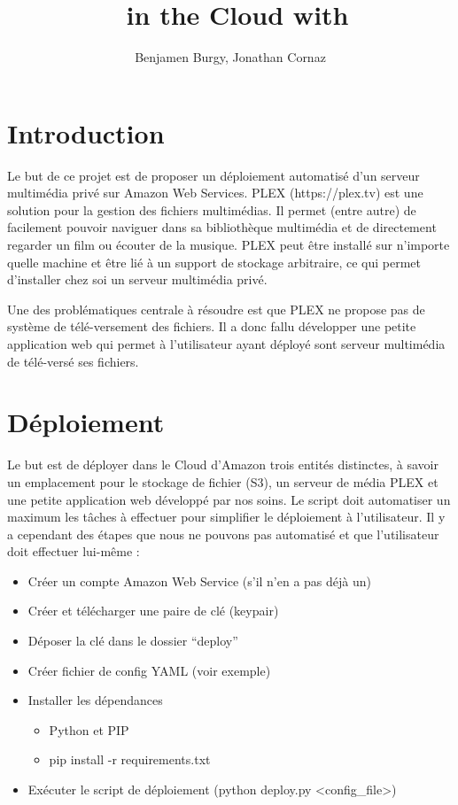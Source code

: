 \documentclass[french]{msereport}
\title{\plex\ in the Cloud with \aws}
\author{Benjamen Burgy, Jonathan Cornaz}
\begin{document}
	
	\section{Introduction}
		Le but de ce projet est de proposer un déploiement automatisé d’un serveur multimédia privé sur Amazon Web Services.
		PLEX (https://plex.tv) est une solution pour la gestion des fichiers multimédias. Il permet (entre autre) de facilement pouvoir naviguer dans sa bibliothèque multimédia et de directement regarder un film ou écouter de la musique. PLEX peut être installé sur n’importe quelle machine et être lié à un support de stockage arbitraire, ce qui permet d’installer chez soi un serveur multimédia privé.
		
		Une des problématiques centrale à résoudre est que PLEX ne propose pas de système de télé-versement des fichiers. Il a donc fallu développer une petite application web qui permet à l’utilisateur ayant déployé sont serveur multimédia de télé-versé ses fichiers.
	
	\section{Déploiement} 
		Le but est de déployer dans le Cloud d’Amazon trois entités distinctes, à savoir un emplacement pour le stockage de fichier (S3), un serveur de média PLEX et une petite application web développé par nos soins. Le script doit automatiser un maximum les tâches à effectuer pour simplifier le déploiement à l’utilisateur.
		Il y a cependant des étapes que nous ne pouvons pas automatisé et que l’utilisateur doit effectuer lui-même :
		\begin{itemize}
			\item Créer un compte Amazon Web Service (s’il n’en a pas déjà un)
			\item Créer et télécharger une paire de clé (keypair)
			\item Déposer la clé dans le dossier “deploy”
			\item Créer fichier de config YAML (voir exemple)
			\item Installer les dépendances
			\begin{itemize}
				\item Python et PIP
				\item pip install -r requirements.txt
			\end{itemize}
			\item Exécuter le script de déploiement (python deploy.py \textless config\_file\textgreater )
		\end{itemize}
\end{document}

